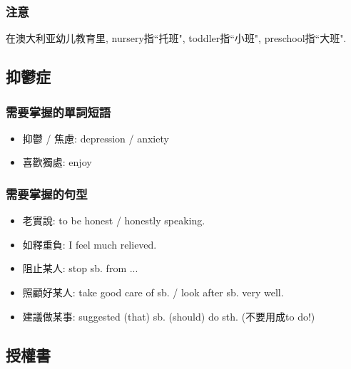 \subsubsection*{注意}
在澳大利亚幼儿教育里, nursery指``托班", toddler指``小班", preschool指``大班".

\subsection{抑鬱症}
\subsubsection*{需要掌握的單詞短語}
\begin{itemize}
  \itemsep0em
  \item 抑鬱 / 焦慮: depression / anxiety
  \item 喜歡獨處: enjoy 
\end{itemize}

\subsubsection*{需要掌握的句型}
\begin{itemize}
  \itemsep0em
  \item 老實說: to be honest / honestly speaking.
  \item 如釋重負: I feel much relieved.
  \item 阻止某人: stop sb. from ...
  \item 照顧好某人: take good care of sb. / look after sb. very well.
  \item 建議做某事: suggested (that) sb. (should) do sth. (不要用成to do!)
\end{itemize}

\subsection{授權書}
